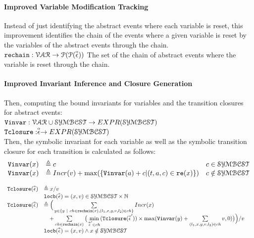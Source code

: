\paragraph*{Improved Variable Modification Tracking}
Instead of just identifying the abstract events where each variable is reset,
this improvement identifies the chain of the events where a given variable is reset by the 
variables of the abstract events through the chain.
\\
$\mathtt{rechain}: \mathcal{VAR} \to \mathcal{P}(\mathcal{P}(\stackrel{\scriptscriptstyle{\alpha}}{\mathtt{\epsilon}{}})) $
The set of the chain of abstract events where the variable is reset through the chain.
%
\paragraph*{Improved Invariant Inference and Closure Generation}
Then, computing the bound invariants for variables and the transition closures for abstract events:
\\ 
$ {\mathtt{Vinvar}}: \mathcal{VAR} \cup \mathcal{SYMBCST} \to EXPR(\mathcal{SYMBCST})$
\\
${\mathtt{Tclosure}}: \stackrel{\scriptscriptstyle{\alpha}}{\mathtt{\epsilon}{}} \to EXPR(\mathcal{SYMBCST})$
\\
Then, the symbolic invariant for each variable 
as well as the symbolic transition closure for each transition is calculated as follows:
\[ 
\begin{array}{lll}
  {\ensuremath{\mathtt{Vinvar}}}(x) & \triangleq c & c \in \mathcal{SYMBCST} \\
  {\mathtt{Vinvar}}(x) & \triangleq Incr(v) + \max(\{{\mathtt{Vinvar}}(a) + c | (t, a, c) \in \mathtt{re}(x)\}) & c \notin \mathcal{SYMBCST}
\end{array}
\]
%
\begin{defn}
  \label{def:transition_closure}
\[ 
\begin{array}{lll}
  {\ensuremath{\mathtt{Tclosure}}}(\stackrel{\scriptscriptstyle{\alpha}}{\mathtt{\epsilon}{}}) 
  & \triangleq x / v & \\ 
  & \mathtt{locb}(\stackrel{\scriptscriptstyle{\alpha}}{\mathtt{\epsilon}{}}) = (x, v) \in \mathcal{SYMBCST} \times \mathbb{N} & \\
  {\mathtt{Tclosure}}(\stackrel{\scriptscriptstyle{\alpha}}{\mathtt{\epsilon}{}}) 
  & \triangleq \Big(
    \sum\limits_{y \in \{ y ~|~ 
    ch \in \mathtt{rechain}(x), (l_1, x, y, v, l_2) \in ch \} } Incr(x) & \\
    & \quad + 
  \sum\limits_{ch \in \mathtt{rechain}(x)}
  \big( \min\limits_{\stackrel{\scriptscriptstyle{\alpha}}{\mathtt{\epsilon}{}}' \in ch}({{\mathtt{Tclosure}}(\stackrel{\scriptscriptstyle{\alpha}}{\mathtt{\epsilon}{}}')}) \times 
  \max({\mathtt{Vinvar}}(y) + \sum\limits_{(l_1, x, y, v, l_2) \in ch } v, 0)\big) \Big) / v & \\
  & \mathtt{locb}(\stackrel{\scriptscriptstyle{\alpha}}{\mathtt{\epsilon}{}}) = (x, v) \land x \notin \mathcal{SYMBCST} & 
\end{array}
  \]
\end{defn}
